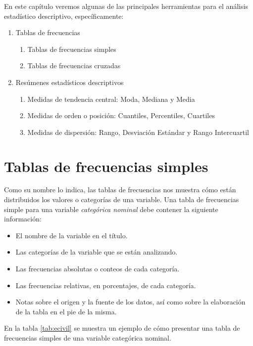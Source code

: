 \documentclass{article}
\begin{document}


En este capítulo veremos algunas de las principales herramientas para el análisis estadístico descriptivo, específicamente:

\begin{enumerate}
  \item Tablas de frecuencias
  \begin{enumerate}
  \item Tablas de frecuencias simples
  \item Tablas de frecuencias cruzadas
  \end{enumerate}
  \item Resúmenes estadísticos descriptivos
  \begin{enumerate}
  \item Medidas de tendencia central: Moda, Mediana y Media
  \item Medidas de orden o posición: Cuantiles, Percentiles, Cuartiles
  \item Medidas de dispersión: Rango, Desviación Estándar y Rango Intercuartil
  \end{enumerate}
\end{enumerate}

\section{Tablas de frecuencias simples}

Como su nombre lo indica, las tablas de frecuencias nos muestra cómo están distribuidos los valores o categorías de una variable. Una tabla de frecuencias simple para una variable \textit{categórica nominal} debe contener la siguiente información:

\begin{itemize}
  \item El nombre de la variable en el título.
  \item Las categorías de la variable que se están analizando.
  \item Las frecuencias absolutas o conteos de cada categoría.
  \item Las frecuencias relativas, en porcentajes, de cada categoría.
  \item Notas sobre el origen y la fuente de los datos, así como sobre la elaboración de la tabla en el pie de la misma.
\end{itemize}

En la tabla \ref{tab:ecivil} se muestra un ejemplo de cómo presentar una tabla de frecuencias simples de una variable categórica nominal.
\end{document}
